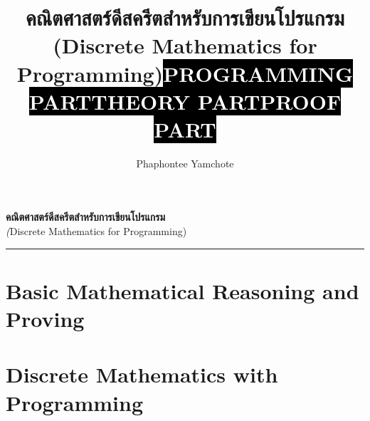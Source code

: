 \documentclass[12pt,twoside,openright]{book}
\title{คณิตศาสตร์ดีสครีตสำหรับการเขียนโปรแกรม\\(Discrete Mathematics for Programming)}
\author{Phaphontee Yamchote}
\date{}
\title{\sffamily\colorbox{black}{\bfseries\textcolor{white}{\Large PROGRAMMING PART}}}
\title{\sffamily\colorbox{black}{\bfseries\textcolor{white}{\Large THEORY PART}}}
\title{\sffamily\colorbox{black}{\bfseries\textcolor{white}{\Large PROOF PART}}}
\theoremstyle{definition}
\begin{document}
\begin{titlepage}
	\raggedleft	
	\hspace{.025\textwidth}
	\parbox[b]{\textwidth}{
		\vspace{1.5cm}
		{\Huge\bfseries คณิตศาสตร์ดีสครีตสำหรับการเขียนโปรแกรม}                \\[20pt] 
		{\Large\textit (Discrete Mathematics for Programming)}
		}
	\vspace{1cm}  
	\vfill
	\rule{1pt}{.15\textheight}
	\hspace{.025\textwidth}
\end{titlepage}
	\frontmatter
	\tableofcontents

	\mainmatter

    
%    
%    
   	\part{Basic Mathematical Reasoning and Proving}
   	
%   	
   	
   	
%   	
%   	
   	\part{Discrete Mathematics with Programming}
   	
   	
   	
   	
   	
   	
   	
   	
%   	
	
	
	\backmatter
%	
	\printindex
\end{document}
